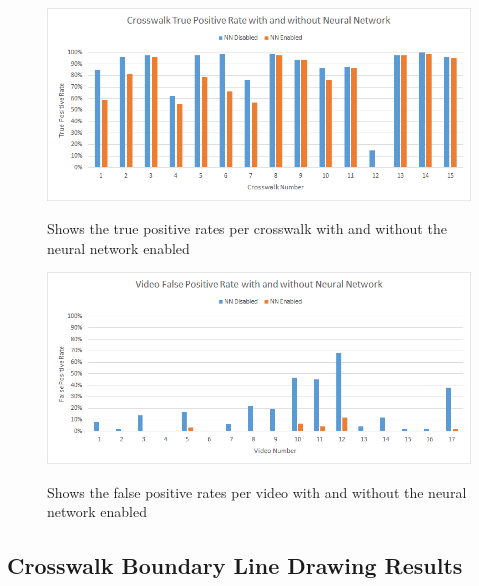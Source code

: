 \documentclass[12pt]{ucthesis}
\newcommand{\captionfonts}{\small\bf\ssp}
\begin{document}
\begin{figure}[H]
\begin{center}
\includegraphics[width=14cm]{CrosswalkTruePosWithAndWithout.png}
\captionfonts
\caption[Crosswalk True Positive Rate with and without Neural Network]{Shows the true positive rates per crosswalk with and without the neural network enabled}
\label{fig:CrosswalkTruePosWithAndWithout}
\end{center}
\end{figure}

\begin{figure}[H]
\begin{center}
\includegraphics[width=14cm]{VideoFalsePosWithAndWithout.png}
\captionfonts
\caption[Video False Positive Rate with and without Neural Network]{Shows the false positive rates per video with and without the neural network enabled}
\label{fig:VideoFalsePosWithAndWithout}
\end{center}
\end{figure}

\subsection{Crosswalk Boundary Line Drawing Results}
\end{document}
